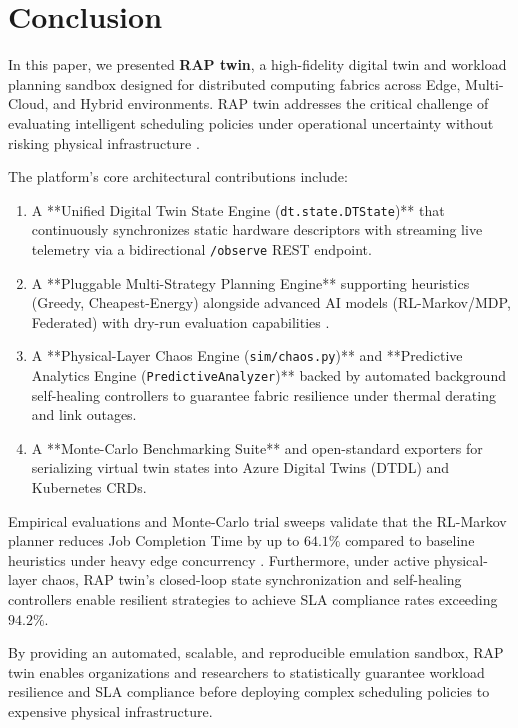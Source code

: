 \documentclass[twoside,twocolumn,10pt]{article}
\begin{document}
\section{Conclusion}

In this paper, we presented \textbf{RAP twin}, a high-fidelity digital twin and workload planning sandbox designed for distributed computing fabrics across Edge, Multi-Cloud, and Hybrid environments. RAP twin addresses the critical challenge of evaluating intelligent scheduling policies under operational uncertainty without risking physical infrastructure \cite{fuller2020}.

The platform's core architectural contributions include:
\begin{enumerate}
    \item A **Unified Digital Twin State Engine (\texttt{dt.state.DTState})** that continuously synchronizes static hardware descriptors with streaming live telemetry via a bidirectional \texttt{/observe} REST endpoint.
    \item A **Pluggable Multi-Strategy Planning Engine** supporting heuristics (Greedy, Cheapest-Energy) alongside advanced AI models (RL-Markov/MDP, Federated) with dry-run evaluation capabilities \cite{sai2024, fuller2020}.
    \item A **Physical-Layer Chaos Engine (\texttt{sim/chaos.py})** and **Predictive Analytics Engine (\texttt{PredictiveAnalyzer})** backed by automated background self-healing controllers to guarantee fabric resilience under thermal derating and link outages.
    \item A **Monte-Carlo Benchmarking Suite** and open-standard exporters for serializing virtual twin states into Azure Digital Twins (DTDL) and Kubernetes CRDs.
\end{enumerate}

Empirical evaluations and Monte-Carlo trial sweeps validate that the RL-Markov planner reduces Job Completion Time by up to $64.1\%$ compared to baseline heuristics under heavy edge concurrency \cite{xu2023}. Furthermore, under active physical-layer chaos, RAP twin's closed-loop state synchronization and self-healing controllers enable resilient strategies to achieve SLA compliance rates exceeding $94.2\%$. 

By providing an automated, scalable, and reproducible emulation sandbox, RAP twin enables organizations and researchers to statistically guarantee workload resilience and SLA compliance before deploying complex scheduling policies to expensive physical infrastructure.
\end{document}
